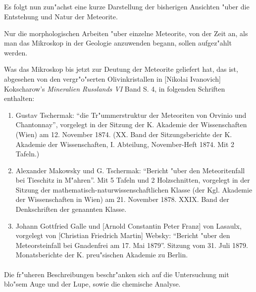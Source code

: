 \documentclass[a4paper, 11pt, oneside]{article}
\begin{document}
\subsection{}
\paragraph{}
Es folgt nun zun"achst eine kurze Darstellung der bisherigen Ansichten "uber die Entstehung und Natur der Meteorite.

Nur die morphologischen Arbeiten "uber einzelne Meteorite, von der Zeit an, als man das Mikroskop in der Geologie anzuwenden begann, sollen aufgez"ahlt werden.

Was das Mikroskop bis jetzt zur Deutung der Meteorite geliefert hat, das ist, abgesehen von den vergr"o"serten Olivinkristallen in [Nikolai Ivanovich] Kokscharow's \emph{Mineralien Russlands VI} Band S. 4, in folgenden Schriften enthalten:
\large
\begin{enumerate}
\item Gustav Tschermak: "`die Tr"ummerstruktur der Meteoriten von Orvinio und Chantonnay"', vorgelegt in der Sitzung der K. Akademie der Wissenschaften (Wien) am 12. November 1874. (XX. Band der Sitzungsberichte der K. Akademie der Wissenschaften, I. Abteilung, November-Heft 1874. Mit 2 Tafeln.)
\item Alexander Makowsky und G. Tschermak: "`Bericht "uber den Meteoritenfall bei Tieschitz in M"ahren"'. Mit 5 Tafeln und 2 Holzschnitten, vorgelegt in der Sitzung der mathematisch-naturwissenschaftlichen Klasse (der Kgl. Akademie der Wissenschaften in Wien) am 21. November 1878. XXIX. Band der Denkschriften der genannten Klasse.
\item Johann Gottfried Galle und [Arnold Constantin Peter Franz] von Lasaulx, vorgelegt von [Christian Friedrich Martin] Websky: "`Bericht "uber den Meteorsteinfall bei Gnadenfrei am 17. Mai 1879"'. Sitzung vom 31. Juli 1879. Monatsberichte der K. preu"sischen Akademie zu Berlin.
\end{enumerate}
\LARGE
\paragraph{}
Die fr"uheren Beschreibungen beschr"anken sich auf die Untersuchung mit blo"sem Auge und der Lupe, sowie die chemische Analyse.
\end{document}
